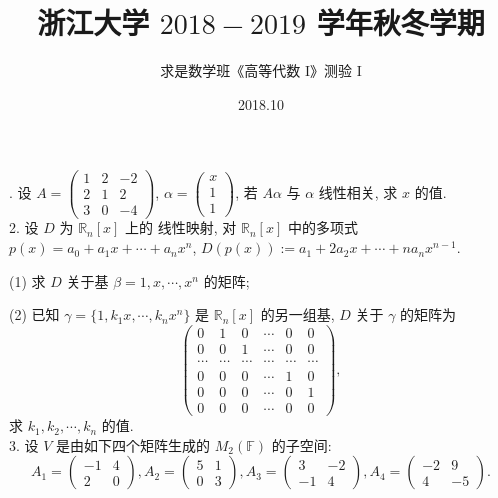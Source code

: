 \documentclass[UTF8]{ctexart}
\title{\LARGE \textbf{浙江大学 $2018-2019$ 学年秋冬学期}}
\author{求是数学班《高等代数 I》测验 I}
\date{2018.10}
\begin{document}
. 设 $A=\left(\begin{array}{ccc}
          1 & 2 & -2 \\
          2 & 1 & 2 \\
          3 & 0 & -4
        \end{array}\right)$, $\alpha=\left(\begin{array}{c}
                                             x \\
                                             1 \\
                                             1
                                           \end{array}\right)$, 若 $A\alpha$ 与 $\alpha$ 线性相关, 求 $x$ 的值.
\\

2. 设 $D$ 为 $\mathbb{R}_n[x]$ 上的 线性映射, 对 $\mathbb{R}_n[x]$ 中的多项式 $p(x)=a_0+a_1x+\cdots+a_nx^n$, $D(p(x)):=a_1+2a_2x+\cdots+na_nx^{n-1}$.

(1) 求 $D$ 关于基 $\beta={1,x,\cdots,x^n}$ 的矩阵;

(2) 已知 $\gamma=\{1,k_1x,\cdots,k_nx^n\}$ 是 $\mathbb{R}_n[x]$ 的另一组基, $D$ 关于 $\gamma$ 的矩阵为
\[
\left(\begin{array}{cccccc}
  0 & 1 & 0 & \cdots & 0 & 0 \\
  0 & 0 & 1 & \cdots & 0 & 0 \\
  \cdots & \cdots & \cdots & \cdots & \cdots & \cdots \\
  0 & 0 & 0 & \cdots & 1 & 0 \\
  0 & 0 & 0 & \cdots & 0 & 1 \\
  0 & 0 & 0 & \cdots & 0 & 0
\end{array}\right),
\]
求 $k_1,k_2,\cdots,k_n$ 的值.
\\

3. 设 $V$ 是由如下四个矩阵生成的 $M_2(\mathbb{F})$ 的子空间:
\[
A_1=\left(\begin{array}{cc}
      -1 & 4 \\
      2 & 0
    \end{array}\right),
A_2=\left(\begin{array}{cc}
      5 & 1 \\
      0 & 3
    \end{array}\right),
A_3=\left(\begin{array}{cc}
      3 & -2 \\
      -1 & 4
    \end{array}\right),
A_4=\left(\begin{array}{cc}
      -2 & 9 \\
      4 & -5
    \end{array}\right).
\]
\end{document}
